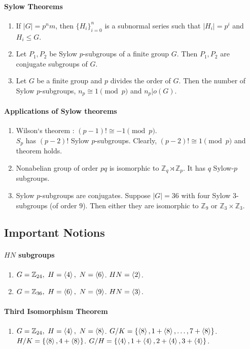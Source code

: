 \paragraph{Sylow Theorems}
\begin{enumerate}
	\item If $|G|=p^nm$, then $\{ H_i \}_{i=0}^n$ is a subnormal series such that $|H_i| = p^i$ and $H_i \le G$.
	\item Let $P_1,P_2$ be Sylow $p$-subgroups of a finite group $G$. Then $P_1,P_2$ are conjugate subgroups of $G$.
	\item Let $G$ be a finite group and $p$ divides the order of $G$.
	Then the number of Sylow $p$-subgroups, $n_p \cong 1 \pmod{p}$ and $n_p|o(G)$.
\end{enumerate}

\paragraph{Applications of Sylow theorems}
\begin{enumerate}
	\item Wilson`s theorem : $(p-1)! \cong -1 \pmod{p}$.\\
	$S_p$ has $(p-2)!$ Sylow $p$-subgroups.
	Clearly, $(p-2)! \cong 1 \pmod{p}$ and theorem holds.
	\item Nonabelian group of order $pq$ is isomorphic to $\mathbb{Z}_q \rtimes \mathbb{Z}_p$. It has $q$ Sylow-$p$ subgroups.
	\item Sylow $p$-subgroups are conjugates.
		Suppose $|G|=36$ with four Sylow $3$-subgroups (of order $9$). Then either they are isomorphic to $\mathbb{Z}_9$ or $\mathbb{Z}_3 \times \mathbb{Z}_3$.
\end{enumerate}

\subsection*{Important Notions}
\paragraph{$HN$ subgroups}
\begin{enumerate}
	\item $G = \mathbb{Z}_{24},\ H = \entity{4},\ N = \entity{6}$. $HN = \left\langle 2 \right\rangle$.
	\item $G = \mathbb{Z}_{36},\ H = \entity{6},\ N = \entity{9}$. $HN = \left\langle 3 \right\rangle$.
\end{enumerate}
\paragraph{Third Isomorphism Theorem}
\begin{enumerate}
	\item $G = \mathbb{Z}_{24},\ H = \entity{4},\ N = \entity{8}$. 
	$G/K = \{ \left\langle 8 \right\rangle, 1 + \left\langle 8 \right\rangle, \dots, 7+\left\langle 8 \right\rangle \}$.\\
	$H/K = \{ \left\langle 8 \right\rangle, 4+\left\langle 8 \right\rangle \}$.
	$G/H = \{ \left\langle 4 \right\rangle, 1+\left\langle 4 \right\rangle, 2+\left\langle 4 \right\rangle, 3+\left\langle 4 \right\rangle \}$.
\end{enumerate}
